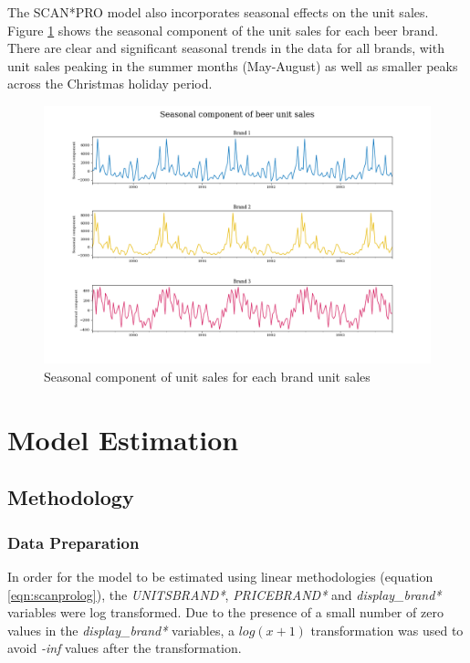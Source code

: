 \documentclass[a4paper,11pt]{article}
\begin{document}
The SCAN*PRO model also incorporates seasonal effects on the unit sales. Figure \ref{fig:seasonal-plots} shows the seasonal component of the unit sales for each beer brand. There are clear and significant seasonal trends in the data for all brands, with unit sales peaking in the summer months (May-August) as well as smaller peaks across the Christmas holiday period.


\begin{figure}
  \centering
  \includegraphics[scale=0.38]{seasonal_plots}
  \caption{Seasonal component of unit sales for each brand unit sales}\label{fig:seasonal-plots}
\end{figure}


\section{Model Estimation}
\subsection{Methodology}

\subsubsection{Data Preparation}
In order for the model to be estimated using linear methodologies (equation \ref{eqn:scanprolog}), the \textit{UNITSBRAND*}, \textit{PRICEBRAND*} and \textit{display\_brand*} variables were log transformed. Due to the presence of a small number of zero values in the \textit{display\_brand*} variables, a $log(x+1)$ transformation \citep{wooldridge_multiple_2016} was used to avoid \textit{-inf} values after the transformation.
\end{document}
